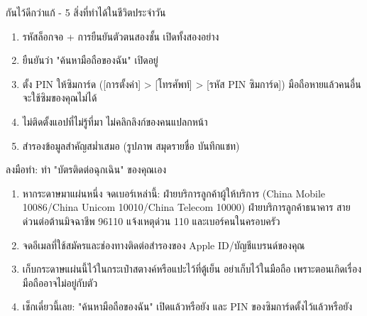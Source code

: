 \begin{tcbwarn}{กันไว้ดีกว่าแก้ - 5 สิ่งที่ทำได้ในชีวิตประจำวัน}
\begin{enumerate}
  \item รหัสล็อกจอ + การยืนยันตัวตนสองชั้น เปิดทั้งสองอย่าง
  \item ยืนยันว่า "ค้นหามือถือของฉัน" เปิดอยู่
  \item ตั้ง PIN ให้ซิมการ์ด ([การตั้งค่า] > [โทรศัพท์] > [รหัส PIN ซิมการ์ด]) มือถือหายแล้วคนอื่นจะใช้ซิมของคุณไม่ได้
  \item ไม่ติดตั้งแอปที่ไม่รู้ที่มา ไม่คลิกลิงก์ของคนแปลกหน้า
  \item สำรองข้อมูลสำคัญสม่ำเสมอ (รูปภาพ สมุดรายชื่อ บันทึกแชท)
\end{enumerate}

\end{tcbwarn}

\begin{tcbpractice}{ลงมือทำ: ทำ "บัตรติดต่อฉุกเฉิน" ของคุณเอง}
\begin{enumerate}
  \item หากระดาษมาแผ่นหนึ่ง จดเบอร์เหล่านี้: ฝ่ายบริการลูกค้าผู้ให้บริการ (China Mobile 10086/China Unicom 10010/China Telecom 10000) ฝ่ายบริการลูกค้าธนาคาร สายด่วนต่อต้านมิจฉาชีพ 96110 แจ้งเหตุด่วน 110 และเบอร์คนในครอบครัว
  \item จดอีเมลที่ใช้สมัครและช่องทางติดต่อสำรองของ Apple ID/บัญชีแบรนด์ของคุณ
  \item เก็บกระดาษแผ่นนี้ไว้ในกระเป๋าสตางค์หรือแปะไว้ที่ตู้เย็น อย่าเก็บไว้ในมือถือ เพราะตอนเกิดเรื่องมือถืออาจไม่อยู่กับตัว
  \item เช็กเดี๋ยวนี้เลย: "ค้นหามือถือของฉัน" เปิดแล้วหรือยัง และ PIN ของซิมการ์ดตั้งไว้แล้วหรือยัง
\end{enumerate}

\end{tcbpractice}

